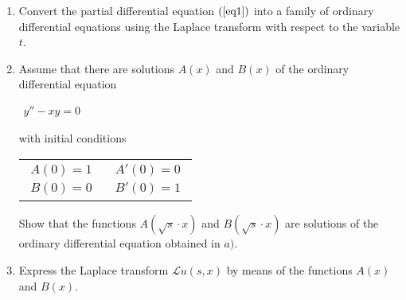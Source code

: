 \documentclass[
	final,
	a4paper,
	oneside,
	parskip=full,
	headings=standardclasses,
	headings=big,
	pointednumbers
]{scrartcl}
\newcommand{\kl}[1]{{\left( #1 \right)}}
\newcommand{\lap}{\mathcal{L}}
\begin{document}
    \begin{enumerate}
        \item{
            Convert the partial differential equation $\kl{\ref{eq1}}$ into a family of
            ordinary differential equations using the Laplace transform with respect to
            the variable $t$.
        }
        \item{
            Assume that there are solutions $A\kl{x}$ and $B\kl{x}$ of the ordinary
            differential equation

            \begin{center}
                \vspace{-3mm}
                $\begin{aligned}
                    y'' - xy = 0
                \end{aligned}$
                \vspace{-3mm}
            \end{center}

            with initial conditions

            \begin{center}
                \vspace{-3mm}
                \begin{tabular}{@{} l l }
                    \rule{0pt}{4ex}$\begin{aligned}
                        A\kl{0} = 1 \\
                        B\kl{0} = 0
                    \end{aligned}$ &
                    $\begin{aligned}
                        A'\kl{0} = 0 \\
                        B'\kl{0} = 1
                    \end{aligned}$
                \end{tabular}
                \vspace{-3mm}
            \end{center}

            Show that the functions $A\kl{\sqrt{s} \cdot x}$ and $B\kl{\sqrt{s} \cdot x}$ are
            solutions of the ordinary differential equation obtained in $a)$.
        }
        \item{
            Express the Laplace transform $\lap u \kl{s,x}$ by means of the
            functions $A\kl{x}$ and $B\kl{x}$.
        }
    \end{enumerate}
\end{document}
